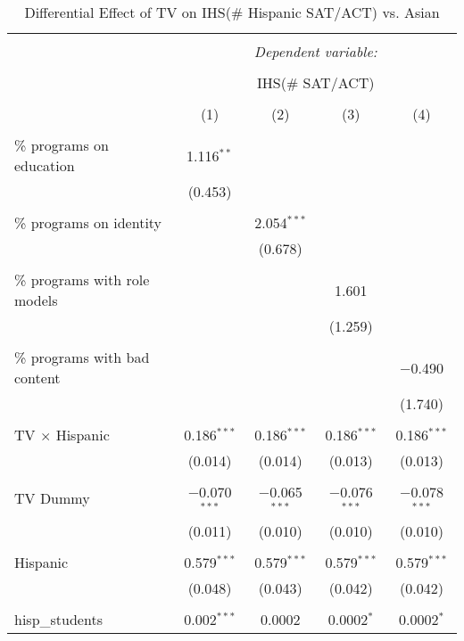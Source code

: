 
\begin{table}[!htbp] \centering 
  \caption{Differential Effect of TV on IHS(\# Hispanic SAT/ACT) vs. Asian} 
  \label{} 
\begin{tabular}{@{\extracolsep{-2pt}}lcccc} 
\\[-1.8ex]\hline 
\hline \\[-1.8ex] 
 & \multicolumn{4}{c}{\textit{Dependent variable:}} \\ 
\cline{2-5} 
\\[-1.8ex] & \multicolumn{4}{c}{IHS(\# SAT/ACT)} \\ 
\\[-1.8ex] & (1) & (2) & (3) & (4)\\ 
\hline \\[-1.8ex] 
 \% programs on education & 1.116$^{**}$ &  &  &  \\ 
  & (0.453) &  &  &  \\ 
  & & & & \\ 
 \% programs on identity &  & 2.054$^{***}$ &  &  \\ 
  &  & (0.678) &  &  \\ 
  & & & & \\ 
 \% programs with role models &  &  & 1.601 &  \\ 
  &  &  & (1.259) &  \\ 
  & & & & \\ 
 \% programs with bad content &  &  &  & $-$0.490 \\ 
  &  &  &  & (1.740) \\ 
  & & & & \\ 
 TV $\times$ Hispanic & 0.186$^{***}$ & 0.186$^{***}$ & 0.186$^{***}$ & 0.186$^{***}$ \\ 
  & (0.014) & (0.014) & (0.013) & (0.013) \\ 
  & & & & \\ 
 TV Dummy & $-$0.070$^{***}$ & $-$0.065$^{***}$ & $-$0.076$^{***}$ & $-$0.078$^{***}$ \\ 
  & (0.011) & (0.010) & (0.010) & (0.010) \\ 
  & & & & \\ 
 Hispanic & 0.579$^{***}$ & 0.579$^{***}$ & 0.579$^{***}$ & 0.579$^{***}$ \\ 
  & (0.048) & (0.043) & (0.042) & (0.042) \\ 
  & & & & \\ 
 hisp\_students & 0.002$^{***}$ & 0.0002 & 0.0002$^{*}$ & 0.0002$^{*}$ \\ 

\end{tabular}
\end{table}
